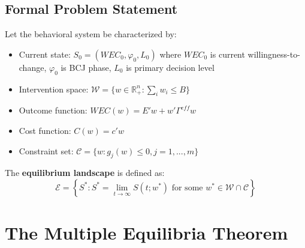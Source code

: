 \subsection{Formal Problem Statement}

Let the behavioral system be characterized by:
\begin{itemize}[nosep]
    \item Current state: $S_0 = (WEC_0, \varphi_0, L_0)$ where $WEC_0$ is current
          willingness-to-change, $\varphi_0$ is BCJ phase, $L_0$ is primary decision level
    \item Intervention space: $\mathcal{W} = \{w \in \mathbb{R}^n_+ : \sum_i w_i \leq B\}$
    \item Outcome function: $WEC(w) = E'w + w'\Gamma^{eff}w$
    \item Cost function: $C(w) = c'w$
    \item Constraint set: $\mathcal{C} = \{w : g_j(w) \leq 0, j = 1,...,m\}$
\end{itemize}

The \textbf{equilibrium landscape} is defined as:
\begin{equation}
\boxed{
\mathcal{E} = \left\{ S^* : S^* = \lim_{t \to \infty} S(t; w^*) \text{ for some } w^* \in \mathcal{W} \cap \mathcal{C} \right\}
}
\end{equation}

\section{The Multiple Equilibria Theorem}
\label{sec:meq-theorem}

